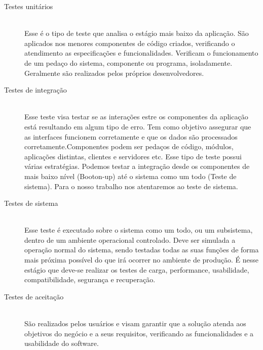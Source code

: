 \begin{description}
\item[Testes unitários] \hfill \\

Esse é o tipo de teste que analisa o estágio mais baixo da aplicação. São aplicados nos menores componentes de código criados, verificando o atendimento as especificações e funcionalidades. Verificam o funcionamento de um pedaço do sistema, componente ou programa,  isoladamente. Geralmente são realizados pelos próprios desenvolvedores.

\item[Testes de integração] \hfill \\

Esse teste visa testar se as interações estre os componentes da aplicação está resultando em algum tipo de erro. Tem como objetivo assegurar que as interfaces funcionem corretamente e que os dados são processados corretamente.Componentes podem ser pedaços de código, módulos, aplicações distintas, clientes e servidores etc. Esse tipo de teste possui várias estratégias. Podemos testar a integração desde os componentes de mais baixo nível (Booton-up)  até o sistema como um todo (Teste de sistema). Para o nosso trabalho nos atentaremos ao teste de sistema.

\item[Testes de sistema] \hfill \\

Esse teste é executado sobre o sistema como um todo, ou um subsistema, dentro de um ambiente operacional controlado. Deve ser simulada a operação normal do sistema, sendo testadas todas as suas funções de forma mais próxima possível do que irá ocorrer no ambiente de produção. É nesse estágio que deve-se realizar os testes de carga, performance, usabilidade, compatibilidade, segurança e recuperação.

\item[Testes de aceitação] \hfill \\

São realizados pelos usuários e visam garantir que a solução atenda aos objetivos do negócio e a seus requisitos, verificando as funcionalidades e a usabilidade do software.
\end{description}


